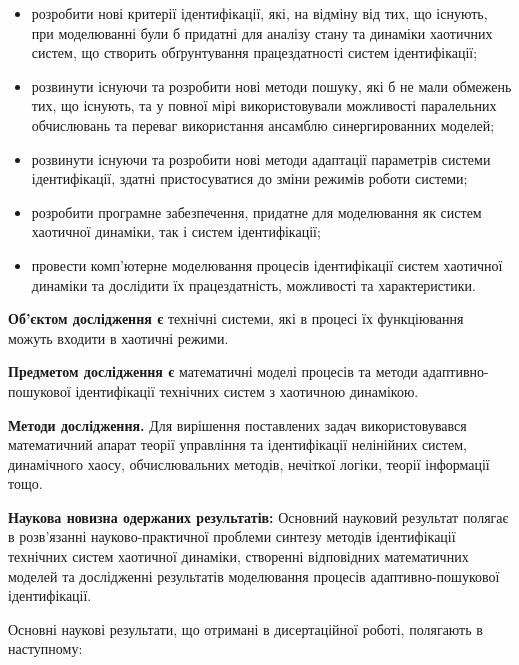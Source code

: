 \documentclass[a4paper,13pt]{atuaref}
\begin{document}
\begin{itemize}

  \item
  розробити нові критерії ідентифікації, які, на відміну від тих, що
  існують, при моделюванні були б придатні для аналізу стану та динаміки
  хаотичних систем, що створить обґрунтування працездатності систем
  ідентифікації;

  \item
  розвинути існуючи та розробити нові методи пошуку, які б не мали
  обмежень тих, що існують, та у повної мірі використовували можливості
  паралельних обчислювань та переваг використання ансамблю
  синергированних моделей;

  \item
  розвинути існуючи та розробити нові методи адаптації параметрів
  системи ідентифікації, здатні пристосуватися до зміни режимів роботи
  системи;

  \item
  розробити програмне забезпечення, придатне для моделювання як систем
  хаотичної динаміки, так і систем ідентифікації;

  \item
  провести комп'ютерне моделювання процесів ідентифікації систем
  хаотичної динаміки та дослідити їх працездатність, можливості та
  характеристики.

\end{itemize}


\textbf{Об'єктом дослідження є}
технічні системи, які в процесі їх функціювання можуть
входити в хаотичні режими.

\smallskip
\textbf{Предметом дослідження є}
математичні моделі процесів та методи
адаптивно-пошукової ідентифікації технічних систем з хаотичною динамікою.

\smallskip
\textbf{Методи дослідження.}
Для вирішення поставлених задач використовувався математичний апарат
теорії управління та ідентифікації нелінійних систем, динамічного хаосу,
обчислювальних методів, нечіткої логіки, теорії інформації тощо.

\smallskip
\textbf{Наукова новизна одержаних результатів:}
Основний науковий результат полягає в розв'язанні науково-практичної проблеми
синтезу методів ідентифікації
технічних систем хаотичної динаміки, створенні відповідних математичних
моделей та дослідженні результатів моделювання процесів
адаптивно-пошукової ідентифікації.

Основні наукові результати, що отримані в дисертаційної роботі, полягають
в наступному:
\end{document}
